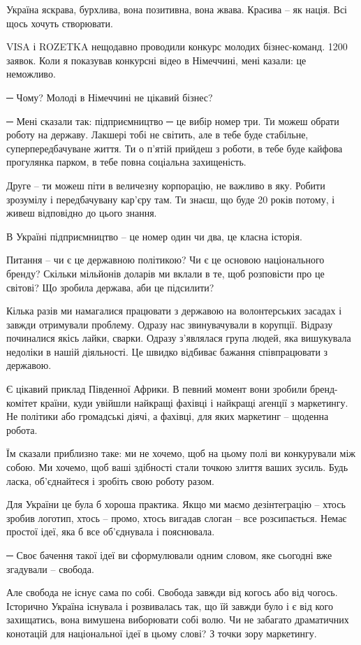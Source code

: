 Україна яскрава, бурхлива, вона позитивна, вона жвава. Красива – як нація. Всі
щось хочуть створювати. 

VISA і ROZETKA нещодавно проводили конкурс молодих бізнес-команд. 1200 заявок.
Коли я показував конкурсні відео в Німеччині, мені казали: це неможливо.

─ Чому? Молоді в Німеччині не цікавий бізнес?

─ Мені сказали так: підприємництво ─ це вибір номер три. Ти можеш обрати роботу
на державу. Лакшері тобі не світить, але в тебе буде стабільне,
суперпередбачуване життя. Ти о п’ятій прийдеш з роботи, в тебе буде кайфова
прогулянка парком, в тебе повна соціальна захищеність.

Друге – ти можеш піти в величезну корпорацію, не важливо в яку. Робити
зрозумілу і передбачувану кар’єру там. Ти знаєш, що буде 20 років потому, і
живеш відповідно до цього знання.

В Україні підприємництво – це номер один чи два, це класна історія.

Питання – чи є це державною політикою? Чи є це основою національного бренду?
Скільки мільйонів доларів ми вклали в те, щоб розповісти про це світові? Що
зробила держава, аби це підсилити?

Кілька разів ми намагалися працювати з державою на волонтерських засадах і
завжди отримували проблему. Одразу нас звинувачували в корупції. Відразу
починалися якісь лайки, сварки. Одразу з’являлася група людей, яка вишукувала
недоліки в нашій діяльності. Це швидко відбиває бажання співпрацювати з
державою.

Є цікавий приклад Південної Африки. В певний момент вони зробили бренд-комітет
країни, куди увійшли найкращі фахівці і найкращі агенції з маркетингу. Не
політики або громадські діячі, а фахівці, для яких маркетинг – щоденна робота. 

Їм сказали приблизно таке: ми не хочемо, щоб на цьому полі ви конкурували між
собою. Ми хочемо, щоб ваші здібності стали точкою злиття ваших зусиль. Будь
ласка, об’єднайтеся і зробіть свою роботу разом.

Для України це була б хороша практика. Якщо ми маємо дезінтеграцію – хтось
зробив логотип, хтось – промо, хтось вигадав слоган – все розсипається. Немає
простої ідеї, яка б все об’єднувала і пояснювала.

─ Своє бачення такої ідеї ви сформулювали одним словом, яке сьогодні вже
згадували – свобода. 

Але свобода не існує сама по собі. Свобода завжди від когось або від чогось.
Історично Україна існувала і розвивалась так, що їй завжди було і є від кого
захищатись, вона вимушена виборювати собі волю. Чи не забагато драматичних
конотацій для національної ідеї в цьому слові? З точки зору маркетингу.

